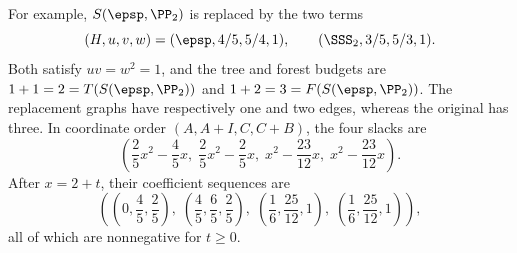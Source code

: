 For example, $S(\epsp,\PP_2)$ is replaced by the two terms
\[
(H,u,v,w)=(\epsp,4/5,5/4,1),\qquad(\SSS_2,3/5,5/3,1).
\]
Both satisfy $uv=w^2=1$, and the tree and forest budgets are
$1+1=2=T(S(\epsp,\PP_2))$ and $1+2=3=F(S(\epsp,\PP_2))$.
The replacement graphs have respectively one and two edges, whereas the
original has three. In coordinate order $(A,A+I,C,C+B)$, the four slacks are
\[
\left(\frac{2}{5}x^{2}-\frac{4}{5}x,\;\frac{2}{5}x^{2}-\frac{2}{5}x,\;x^{2}-\frac{23}{12}x,\;x^{2}-\frac{23}{12}x\right).
\]
After $x=2+t$, their coefficient sequences are
\[
\left((0,\frac{4}{5},\frac{2}{5}),\;(\frac{4}{5},\frac{6}{5},\frac{2}{5}),\;(\frac{1}{6},\frac{25}{12},1),\;(\frac{1}{6},\frac{25}{12},1)\right),
\]
all of which are nonnegative for $t\geq0$.
